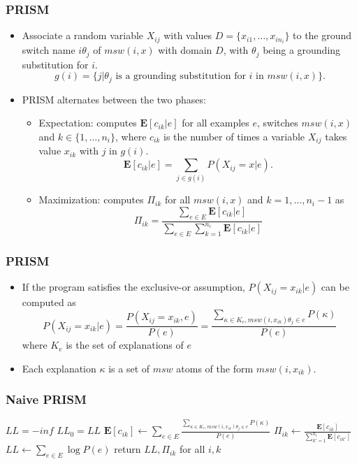 \documentclass[trans,aspectratio=1610]{beamer}
\newcommand{\defpprog}{\ensuremath{\mathcal{P}}\xspace}
\begin{document}
\begin{frame}
  \frametitle{PRISM}
\begin{itemize}
\item Associate a random variable $X_{ij}$ with values $D=\{x_{i1},\ldots,x_{in_i}\}$ to the ground switch name $i\theta_j$  of $msw(i,x)$ with domain $D$, with $\theta_j$ being a grounding
substitution for $i$. 
$$g(i)=\{j|\theta_j \mbox{ is a grounding substitution for $i$ in } msw(i,x) \}.$$
\item PRISM alternates between the two phases:
\begin{itemize}
\item 
Expectation:
computes $\mathbf{E}[c_{ik}|e]$ for all examples $e$, switches $msw(i,x)$ and $k\in\{1,\ldots,n_i\}$, where $c_{ik}$ is the number of times a variable $X_{ij}$ takes value $x_{ik}$  with $j$ in $g(i)$.
$$\mathbf{E}[c_{ik}|e]=\sum_{j\in g(i)}P(X_{ij}=x|e).$$
\item
Maximization: computes $\Pi_{ik}$ for all $msw(i,x)$ and $k=1,\ldots,n_i-1$ as
$$\Pi_{ik}=\frac{\sum_{e\in E}\mathbf{E}[c_{ik}|e]}{\sum_{e\in E}\sum_{k=1}^{n_i}\mathbf{E}[c_{ik}|e]}$$
\end{itemize}
\end{itemize}
\end{frame}
\begin{frame}
  \frametitle{PRISM}
\begin{itemize}
\item
If the program satisfies the exclusive-or
assumption, $P(X_{ij}=x_{ik}|e)$ can be computed as
$$P(X_{ij}=x_{ik}|e)=\frac{P(X_{ij}=x_{ik},e)}{P(e)}=
\frac{\sum_{\kappa\in K_e,msw(i,x_{ik})\theta_j\in e}P(\kappa)}{P(e)}$$
where $K_e$ is the set of explanations of $e$ 
\item Each explanation $\kappa$ is a set of 
$msw$ atoms of the form $msw(i,x_{ik})$.
\end{itemize}
\end{frame}
\begin{frame}
  \frametitle{Naive PRISM}
\begin{algorithmic}[1]
\Function{PRISM-EM-Naive}{$E,\defpprog,\epsilon$}
\State $LL=-\mathit{inf}$
\Repeat
  \State $LL_0=LL$
    \State $\mathbf{E}[c_{ik}]\gets \sum_{e\in E}\frac{\sum_{\kappa\in K_e,msw(i,x_{ik})\theta_j\in e}P(\kappa)}{P(e)}$
  \EndFor
    \State $\Pi_{ik}\gets \frac{ \mathbf{E}[c_{ik}]}{\sum_{k'=1}^{n_i}\mathbf{E}[c_{ik'}]}$
  \EndFor
  \State $LL\gets \sum_{e\in E}\log P(e)$
\State return $LL,\Pi_{ik}$ for all $i,k$
\EndFunction
\end{algorithmic}

\end{frame}
\end{document}
